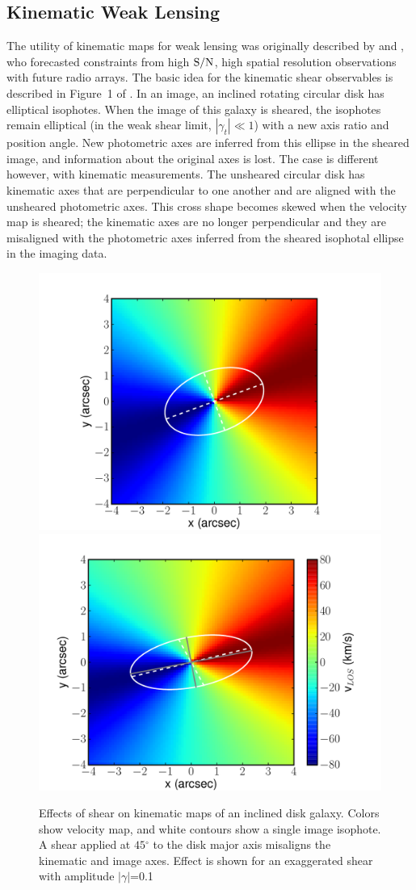 \documentclass[12pt]{article}
\newcommand{\degr}{\ensuremath{^\circ}}
\begin{document}
\subsection{Kinematic Weak Lensing}

The utility of kinematic maps for weak lensing was originally described by \citet{Blain2002} and \citet{Morales2006}, who forecasted constraints from high ${\rm S/N}$, high spatial resolution observations with future radio arrays. The basic idea for the kinematic shear observables is described in Figure~1 of \citet{Morales2006}. In an image, an inclined rotating circular disk has elliptical isophotes. When the image of this galaxy is sheared, the isophotes remain elliptical (in the weak shear limit, $|\gamma_t|\ll1$) with a new axis ratio and position angle. New photometric axes are inferred from this ellipse in the sheared image, and information about the original axes is lost. The case is different however, with kinematic measurements. The unsheared circular disk has kinematic axes that are perpendicular to one another and are aligned with the unsheared photometric axes. This cross shape becomes skewed when the velocity map is sheared; the kinematic axes are no longer perpendicular and they are misaligned with the photometric axes inferred from the sheared isophotal ellipse in the imaging data.

\begin{figure}[t]
\begin{center}
\includegraphics[width=0.45\linewidth]{Plots/fig1a.pdf}
\includegraphics[width=0.45\linewidth]{Plots/fig1b.pdf}
\caption{Effects of shear on kinematic maps of an inclined disk galaxy. Colors show velocity map, and white contours show a single image isophote. A shear applied at $45\degr$ to the disk major axis misaligns the kinematic and image axes. Effect is shown for an exaggerated shear with amplitude $|\gamma|$=0.1}
\label{fig:vmaps}
\end{center}
\end{figure}
\end{document}
